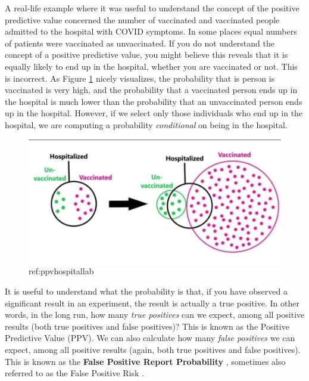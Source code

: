 \documentclass[
  oneside]{book}
\begin{document}
A real-life example where it was useful to understand the concept of the positive predictive value concerned the number of vaccinated and vaccinated people admitted to the hospital with COVID symptoms. In some places equal numbers of patients were vaccinated as unvaccinated. If you do not understand the concept of a positive predictive value, you might believe this reveals that it is equally likely to end up in the hospital, whether you are vaccinated or not. This is incorrect. As Figure \ref{fig:ppvhospital} nicely visualizes, the probability that is person is vaccinated is very high, and the probability that a vaccinated person ends up in the hospital is much lower than the probability that an unvaccinated person ends up in the hospital. However, if we select only those individuals who end up in the hospital, we are computing a probability \emph{conditional} on being in the hospital.



\begin{figure}

{\centering \includegraphics[width=1\linewidth]{images/hospitalvaccinated} 

}

\caption{ref:ppvhospitallab}\label{fig:ppvhospital}
\end{figure}

It is useful to understand what the probability is that, if you have observed a significant result in an experiment, the result is actually a true positive. In other words, in the long run, how many \emph{true positives} can we expect, among all positive results (both true positives and false positives)? This is known as the Positive Predictive Value (PPV). We can also calculate how many \emph{false positives} we can expect, among all positive results (again, both true positives and false positives). This is known as the \textbf{False Positive Report Probability} \citep{wacholder_assessing_2004}, sometimes also referred to as the False Positive Risk \citep{colquhoun_false_2019}.
\end{document}

